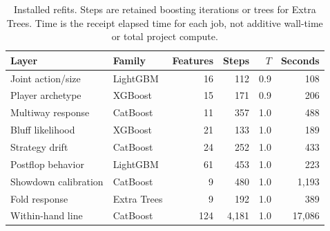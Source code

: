 \begin{table}[!htbp]
\centering\small
\caption{Installed refits. Steps are retained boosting iterations or trees for Extra Trees. Time is the receipt elapsed time for each job, not additive wall-time or total project compute.}
\label{tab:training}
\begin{tabular}{llrrrr}
\toprule
Layer & Family & Features & Steps & $T$ & Seconds \\
\midrule
Joint action/size & LightGBM & 16 & 112 & 0.9 & 108 \\
Player archetype & XGBoost & 15 & 171 & 0.9 & 206 \\
Multiway response & CatBoost & 11 & 357 & 1.0 & 488 \\
Bluff likelihood & XGBoost & 21 & 133 & 1.0 & 189 \\
Strategy drift & CatBoost & 24 & 252 & 1.0 & 433 \\
Postflop behavior & LightGBM & 61 & 453 & 1.0 & 223 \\
Showdown calibration & CatBoost & 9 & 480 & 1.0 & 1,193 \\
Fold response & Extra Trees & 9 & 192 & 1.0 & 389 \\
Within-hand line & CatBoost & 124 & 4,181 & 1.0 & 17,086 \\
\bottomrule
\end{tabular}
\end{table}
